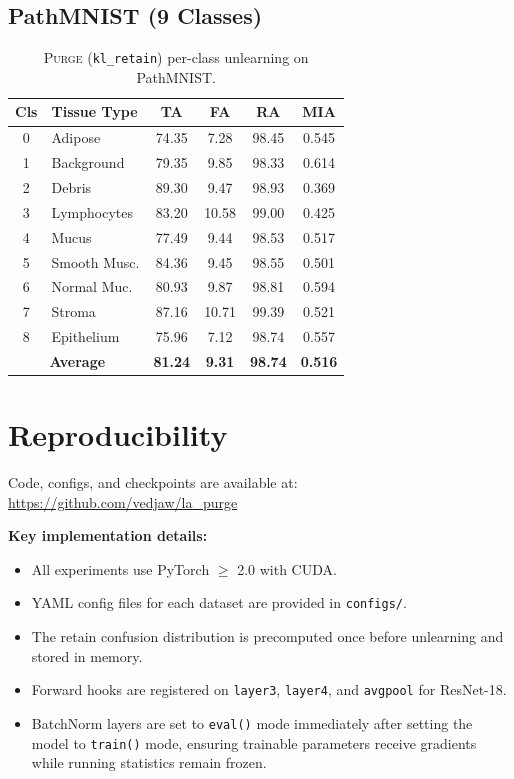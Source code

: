 \documentclass{article}
\newcommand{\ours}{\textsc{Purge}}
\newcommand{\klr}{\texttt{kl\_retain}}
\begin{document}
\subsection{PathMNIST (9 Classes)}

\begin{table}[h]
\centering
\caption{\ours{} (\klr{}) per-class unlearning on PathMNIST.}
\label{tab:pathmnist_full}
\small
\begin{tabular}{clcccc}
\toprule
Cls & Tissue Type & TA & FA & RA & MIA \\
\midrule
0 & Adipose & 74.35 & 7.28 & 98.45 & 0.545 \\
1 & Background & 79.35 & 9.85 & 98.33 & 0.614 \\
2 & Debris & 89.30 & 9.47 & 98.93 & 0.369 \\
3 & Lymphocytes & 83.20 & 10.58 & 99.00 & 0.425 \\
4 & Mucus & 77.49 & 9.44 & 98.53 & 0.517 \\
5 & Smooth Musc. & 84.36 & 9.45 & 98.55 & 0.501 \\
6 & Normal Muc. & 80.93 & 9.87 & 98.81 & 0.594 \\
7 & Stroma & 87.16 & 10.71 & 99.39 & 0.521 \\
8 & Epithelium & 75.96 & 7.12 & 98.74 & 0.557 \\
\midrule
\multicolumn{2}{c}{\textbf{Average}} & \textbf{81.24} & \textbf{9.31} & \textbf{98.74} & \textbf{0.516} \\
\bottomrule
\end{tabular}
\end{table}

\section{Reproducibility}

Code, configs, and checkpoints are available at: \url{https://github.com/vedjaw/la_purge} %

\textbf{Key implementation details:}
\begin{itemize}
    \item All experiments use PyTorch $\geq$ 2.0 with CUDA.
    \item YAML config files for each dataset are provided in \texttt{configs/}.
    \item The retain confusion distribution is precomputed once before unlearning and stored in memory.
    \item Forward hooks are registered on \texttt{layer3}, \texttt{layer4}, and \texttt{avgpool} for ResNet-18.
    \item BatchNorm layers are set to \texttt{eval()} mode immediately after setting the model to \texttt{train()} mode, ensuring trainable parameters receive gradients while running statistics remain frozen.
\end{itemize}
\end{document}
